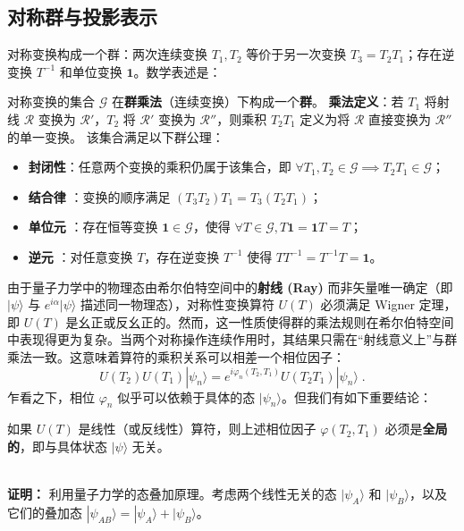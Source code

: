 \subsection{对称群与投影表示}

对称变换构成一个群：两次连续变换 $T_1, T_2$ 等价于另一次变换 $T_3 = T_2 T_1$；存在逆变换 $T^{-1}$ 和单位变换 $\mathbf{1}$。数学表述是：
\begin{tcolorbox}[colback=white!5,colframe=black!45]
对称变换的集合 $\mathcal{G}$ 在\textbf{群乘法}（连续变换）下构成一个\textbf{群}。
\textbf{乘法定义}：若 $T_1$ 将射线 $\mathscr{R}$ 变换为 $\mathscr{R}'$，$T_2$ 将 $\mathscr{R}'$ 变换为 $\mathscr{R}''$，则乘积 $T_2 T_1$ 定义为将 $\mathscr{R}$ 直接变换为 $\mathscr{R}''$ 的单一变换。
该集合满足以下群公理：
\begin{itemize}
    \item \textbf{封闭性}：任意两个变换的乘积仍属于该集合，即 $\forall T_1, T_2 \in \mathcal{G} \implies T_2 T_1 \in \mathcal{G}$；
    \item \textbf{结合律 }：变换的顺序满足 $(T_3 T_2) T_1 = T_3 (T_2 T_1)$；
    \item \textbf{单位元 }：存在恒等变换 $\mathbf{1} \in \mathcal{G}$，使得 $\forall T \in \mathcal{G}, T \mathbf{1} = \mathbf{1} T = T$；
    \item \textbf{逆元 }：对任意变换 $T$，存在逆变换 $T^{-1}$ 使得 $T T^{-1} = T^{-1} T = \mathbf{1}$。
\end{itemize}
\end{tcolorbox}
由于量子力学中的物理态由希尔伯特空间中的\textbf{射线 (Ray)} 而非矢量唯一确定（即 $|\psi\rangle$ 与 $e^{i\alpha}|\psi\rangle$ 描述同一物理态），对称性变换算符 $U(T)$ 必须满足 Wigner 定理，即 $U(T)$ 是幺正或反幺正的。然而，这一性质使得群的乘法规则在希尔伯特空间中表现得更为复杂。当两个对称操作连续作用时，其结果只需在“射线意义上”与群乘法一致。这意味着算符的乘积关系可以相差一个相位因子：
\begin{equation}
    U(T_2)U(T_1)|\psi_n\rangle = e^{i\varphi_n(T_2, T_1)} U(T_2 T_1)|\psi_n\rangle \;.
\end{equation}
乍看之下，相位 $\varphi_n$ 似乎可以依赖于具体的态 $|\psi_n\rangle$。但我们有如下重要结论：
\begin{tcolorbox}[colback=white!5,colframe=black!45]
        如果 $U(T)$ 是线性（或反线性）算符，则上述相位因子 $\varphi(T_2, T_1)$ 必须是\textbf{全局的}，即与具体状态 $|\psi\rangle$ 无关。
\end{tcolorbox}
\noindent
\\
\textbf{证明：}
利用量子力学的态叠加原理。考虑两个线性无关的态 $|\psi_A\rangle$ 和 $|\psi_B\rangle$，以及它们的叠加态 $|\psi_{AB}\rangle = |\psi_A\rangle + |\psi_B\rangle$。

